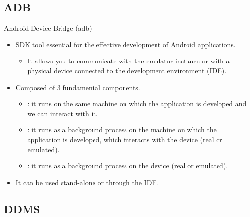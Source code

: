 \documentclass{beamer}
\begin{document}
  \subsection{ADB}

    \begin{frame}{Android Device Bridge (adb)}
      \begin{itemize}
        \item SDK tool essential for the effective development of Android
        applications.
        \begin{itemize}
          \item It allows you to communicate with the emulator instance or with a
          physical device connected to the development environment (IDE).
        \end{itemize}
        \item Composed of 3 fundamental components.
        \begin{itemize}
          \item {}: it runs on the same machine on which the
          application is developed and we can interact with it.
          \item {}: it runs as a background process on the machine on
          which the application is developed, which interacts with the device
          (real or emulated).
          \item {}: it runs as a background process on the device (real
          or emulated). 
        \end{itemize}
        \item It can be used stand-alone or through the IDE.
      \end{itemize}
    \end{frame}

  \subsection{DDMS}
\end{document}

